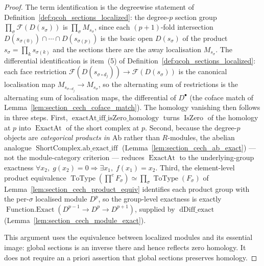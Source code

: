 \begin{proof}
  The term identification is the degreewise statement of
  Definition~\ref{def:qcoh_sections_localized}: the degree-\(p\) section group
  \(\prod_\sigma \mathcal{F}(D(s_\sigma))\) is \(\prod_\sigma M_{s_\sigma}\), since
  each \((p+1)\)-fold intersection \(D(s_{\sigma(0)}) \cap \cdots \cap
  D(s_{\sigma(p)})\) is the basic open \(D(s_\sigma)\) of the product
  \(s_\sigma = \prod_k s_{\sigma(k)}\) and the sections there are the away
  localisation \(M_{s_\sigma}\). The differential identification is item~(5) of
  Definition~\ref{def:qcoh_sections_localized}: each face restriction
  \(\mathcal{F}(D(s_{\sigma \circ d_j})) \to \mathcal{F}(D(s_\sigma))\) is the
  canonical localisation map \(M_{s_{\sigma \circ d_j}} \to M_{s_\sigma}\), so the
  alternating sum of restrictions is the alternating sum of localisation maps, the
  differential of \(D^\bullet\) (the coface match of
  Lemma~\ref{lem:section_cech_coface_match}). The homology vanishing then follows in
  three steps. First, \(\operatorname{exactAt\_iff\_isZero\_homology}\) turns
  \(\operatorname{IsZero}\) of the homology at \(p\) into \(\operatorname{ExactAt}\) of
  the short complex at \(p\). Second, because the degree-\(p\) objects are
  \emph{categorical products in \(\mathrm{Ab}\)} rather than \(R\)-modules, the abelian
  analogue \(\operatorname{ShortComplex.ab\_exact\_iff}\)
  (Lemma~\ref{lem:section_cech_ab_exact}) --- not the module-category criterion ---
  reduces \(\operatorname{ExactAt}\) to the underlying-group exactness
  \(\forall x_2,\; g(x_2) = 0 \Rightarrow \exists x_1,\; f(x_1) = x_2\). Third, the
  element-level product equivalence
  \(\operatorname{ToType}(\prod^{c} F_\sigma) \simeq \prod_\sigma
  \operatorname{ToType}(F_\sigma)\) of Lemma~\ref{lem:section_cech_product_equiv}
  identifies each product group with the per-\(\sigma\) localised module \(D^p\), so the
  group-level exactness is exactly \(\operatorname{Function.Exact}(D^{p-1} \to D^p \to
  D^{p+1})\), supplied by \(\operatorname{dDiff\_exact}\)
  (Lemma~\ref{lem:section_cech_module_exact}).

  This argument uses the equivalence between localized modules and its essential
  image: global sections is an inverse there and hence reflects zero homology. It does
  not require an a priori assertion that global sections preserves homology.
\end{proof}

